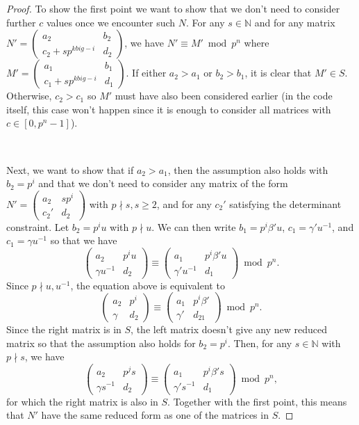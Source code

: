 \documentclass[letterpaper,12pt]{article}
\begin{document}
\begin{proof}
To show the first point we want to show that
we don't need to consider further $c$ values once we encounter such $N$.
For any $s \in \mathbb{N}$ and
for any matrix $N' = \begin{pmatrix} a_2 & b_2 \\ c_2 + sp^{kbig-i} & d_2 \end{pmatrix}$,
we have $N' \equiv M' \bmod p^n$ 
where $M' = \begin{pmatrix} a_1 & b_1 \\ c_1 + sp^{kbig-i} & d_1 \end{pmatrix}$.
If either $a_2 > a_1$ or $b_2 > b_1$, it is clear that $M' \in S$.
Otherwise, $c_2 > c_1$ so $M'$ must have also been considered earlier
(in the code itself, this case won't happen since it is enough to consider all matrices with $c \in [0, p^n-1]$).

\

Next, we want to show that if $a_2 > a_1$, then the assumption also holds with $b_2 = p^i$
and that we don't need to consider any matrix of the form 
$N' = \begin{pmatrix} a_2 & sp^i \\ c_2' & d_2 \end{pmatrix}$ with $p \nmid s, s \geq 2$,
and for any $c_2'$ satisfying the determinant constraint.
Let $b_2 = p^i u$ with $p \nmid u$.
We can then write $b_1 = p^i \beta' u$, $c_1 = \gamma' u^{-1}$, and 
$c_1 = \gamma u^{-1}$ so that we have 
\[
\begin{pmatrix} a_2 & p^i u \\ \gamma u^{-1} & d_2 \end{pmatrix}
\equiv \begin{pmatrix} a_1 & p^i \beta' u \\ \gamma' u^{-1} & d_1 \end{pmatrix} \bmod p^n.
\]
Since $p \nmid u, u^{-1}$, the equation above is equivalent to
\[
\begin{pmatrix} a_2 & p^i \\ \gamma & d_2 \end{pmatrix}
\equiv \begin{pmatrix} a_1 & p^i \beta'\\ \gamma' & d_21\end{pmatrix} \bmod p^n.
\]
Since the right matrix is in $S$, the left matrix doesn't give any new reduced matrix
so that the assumption also holds for $b_2 = p^i$.  
Then, for any $s \in \mathbb{N}$ with $p \nmid s$, we have 
\[
\begin{pmatrix} a_2 & p^js \\ \gamma s^{-1} & d_2 \end{pmatrix}
\equiv \begin{pmatrix} a_1 & p^i \beta's\\ \gamma's^{-1} & d_1 \end{pmatrix} \bmod p^n,
\]
for which the right matrix is also in $S$.
Together with the first point, this means that $N'$
have the same reduced form as one of the matrices in $S$.


\end{proof}
\end{document}
